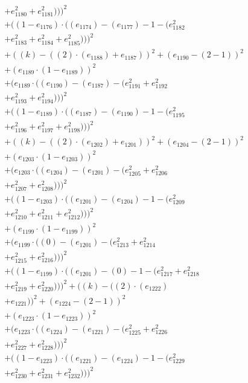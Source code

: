 \documentclass[10pt, a4paper]{article}
\begin{document}
\begin{align*}
& + e_{1180}^{2} + e_{1181}^{2})))^{2} \\
& + ((1 - e_{1176})  \cdot  ((e_{1174}) - (e_{1177}) - 1 - (e_{1182}^{2} \\
& + e_{1183}^{2} + e_{1184}^{2} + e_{1185}^{2})))^{2} \\
& + ((k) - ((2)  \cdot  (e_{1188}) + e_{1187}))^{2} + (e_{1190} - (2 - 1))^{2} \\
& + (e_{1189}  \cdot  (1 - e_{1189}))^{2} \\
& + (e_{1189}  \cdot  ((e_{1190}) - (e_{1187}) - (e_{1191}^{2} + e_{1192}^{2} \\
& + e_{1193}^{2} + e_{1194}^{2})))^{2} \\
& + ((1 - e_{1189})  \cdot  ((e_{1187}) - (e_{1190}) - 1 - (e_{1195}^{2} \\
& + e_{1196}^{2} + e_{1197}^{2} + e_{1198}^{2})))^{2} \\
& + ((k) - ((2)  \cdot  (e_{1202}) + e_{1201}))^{2} + (e_{1204} - (2 - 1))^{2} \\
& + (e_{1203}  \cdot  (1 - e_{1203}))^{2} \\
& + (e_{1203}  \cdot  ((e_{1204}) - (e_{1201}) - (e_{1205}^{2} + e_{1206}^{2} \\
& + e_{1207}^{2} + e_{1208}^{2})))^{2} \\
& + ((1 - e_{1203})  \cdot  ((e_{1201}) - (e_{1204}) - 1 - (e_{1209}^{2} \\
& + e_{1210}^{2} + e_{1211}^{2} + e_{1212}^{2})))^{2} \\
& + (e_{1199}  \cdot  (1 - e_{1199}))^{2} \\
& + (e_{1199}  \cdot  ((0) - (e_{1201}) - (e_{1213}^{2} + e_{1214}^{2} \\
& + e_{1215}^{2} + e_{1216}^{2})))^{2} \\
& + ((1 - e_{1199})  \cdot  ((e_{1201}) - (0) - 1 - (e_{1217}^{2} + e_{1218}^{2} \\
& + e_{1219}^{2} + e_{1220}^{2})))^{2} + ((k) - ((2)  \cdot  (e_{1222}) \\
& + e_{1221}))^{2} + (e_{1224} - (2 - 1))^{2} \\
& + (e_{1223}  \cdot  (1 - e_{1223}))^{2} \\
& + (e_{1223}  \cdot  ((e_{1224}) - (e_{1221}) - (e_{1225}^{2} + e_{1226}^{2} \\
& + e_{1227}^{2} + e_{1228}^{2})))^{2} \\
& + ((1 - e_{1223})  \cdot  ((e_{1221}) - (e_{1224}) - 1 - (e_{1229}^{2} \\
& + e_{1230}^{2} + e_{1231}^{2} + e_{1232}^{2})))^{2} \\

\end{align*}
\end{document}
